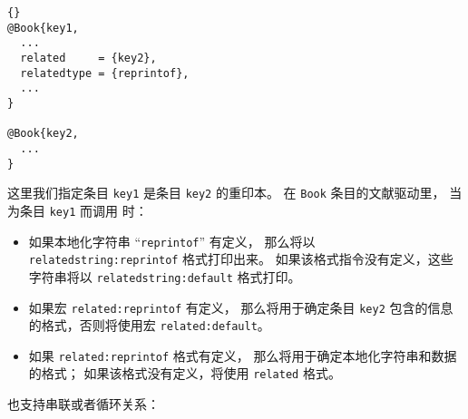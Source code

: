 \begin{lstlisting}[style=bibtex]{}
@Book{key1,
  ...
  related     = {key2},
  relatedtype = {reprintof},
  ...
}

@Book{key2,
  ...
}
\end{lstlisting}
%
这里我们指定条目 \texttt{key1} 是条目 \texttt{key2} 的重印本。
在 \texttt{Book} 条目的文献驱动里，
当为条目 \texttt{key1} 而调用  时：

\begin{itemize}
\item %
如果本地化字符串 “\texttt{reprintof}” 有定义，
那么将以 \texttt{relatedstring:reprintof} 格式打印出来。
如果该格式指令没有定义，这些字符串将以 \texttt{relatedstring:default} 格式打印。
\item %
如果宏 \texttt{related:reprintof} 有定义，
那么将用于确定条目 \texttt{key2} 包含的信息的格式，否则将使用宏 \texttt{related:default}。
\item %
如果 \texttt{related:reprintof} 格式有定义，
那么将用于确定本地化字符串和数据的格式；
如果该格式没有定义，将使用 \texttt{related} 格式。
\end{itemize}
%
也支持串联或者循环关系：

